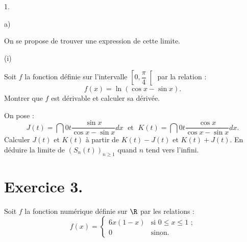 \documentclass[11pt]{article}%
\begin{document}
\begin{noliste}{1.}
\begin{noliste}{a)}
\item On se propose de trouver une expression de cette limite.

\begin{nonoliste}{(i)}
\item Soit $f$ la fonction définie sur l'intervalle $\left[
0,\dfrac{\pi }{4}\right[ $ par la relation : 
\[
f(x) = \ln \left( \cos x-\sin x\right).
\]
Montrer que $f$ est dérivable et calculer sa dérivée.

\item On pose : 
\[
J(t) = \dint{0}{t}\frac{\sin x}{\cos x-\sin x}dx\;\text{ et }\;K(t) =
\dint{0}{t}\frac{\cos x}{\cos x-\sin x}dx.
\]
Calculer $J(t)$ et $K(t)$ à partir de $K(t)-J(t)$ et $K(t) + J(t)$. En
déduire
la limite de $(S_{n}(t))_{n\geq 1}$ quand $n$ tend vers l'infini.
\end{nonoliste}
\end{noliste}
\end{noliste}

\section*{Exercice 3.}

Soit $f$ la fonction numérique définie sur $\R$ par les relations : 
\[
f(x) = \left\{
\begin{array}{cl}
6x(1-x) & \text{si $0\leq x\leq 1$ ;} \\
0 & \text{sinon.}
\end{array}
\right.
\]
\end{document}
